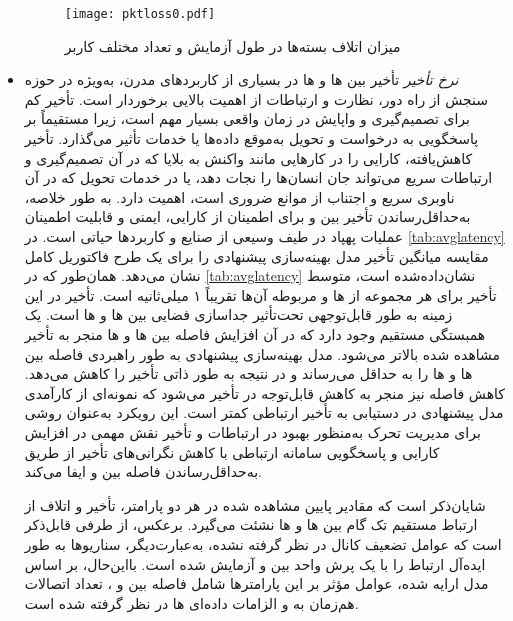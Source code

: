 \begin{itemize}
\begin{figure}
\texttt{[image: pktloss0.pdf]}
\caption[%
میزان اتلاف بسته‌ها در طول آزمایش و تعداد مختلف کاربر]{میزان اتلاف بسته‌ها در طول آزمایش و تعداد مختلف کاربر}
	\label{fig:PacketLossPlot}
\end{figure}		
	\item  \textit{نرخ تأخیر}
	تأخیر بین ها و ها در بسیاری از کاربردهای مدرن، به‌ویژه در حوزه سنجش از راه دور، نظارت و ارتباطات از اهمیت بالایی برخوردار است. تأخیر کم برای تصمیم‌گیری و واپایش در زمان واقعی بسیار مهم است، زیرا مستقیماً بر پاسخگویی  به درخواست  و تحویل به‌موقع داده‌ها یا خدمات تأثیر می‌گذارد. تأخیر کاهش‌یافته، کارایی  را در کارهایی مانند واکنش به بلایا که در آن تصمیم‌گیری و ارتباطات سریع می‌تواند جان انسان‌ها را نجات دهد، یا در خدمات تحویل که در آن ناوبری سریع و اجتناب از موانع ضروری است، اهمیت دارد. به طور خلاصه، به‌حداقل‌رساندن تأخیر بین  و  برای اطمینان از کارایی، ایمنی و قابلیت اطمینان عملیات پهپاد در طیف وسیعی از صنایع و کاربردها حیاتی است. 
	در \autoref{tab:avglatency} مقایسه میانگین تأخیر مدل بهینه‌سازی پیشنهادی را برای یک طرح فاکتوریل کامل نشان می‌دهد. همان‌طور که در \autoref{tab:avglatency} نشان‌داده‌شده است، متوسط تأخیر برای هر مجموعه از ها و  مربوطه آن‌ها تقریباً ۱ میلی‌ثانیه است.
	تأخیر در این زمینه به طور قابل‌توجهی تحت‌تأثیر جداسازی فضایی بین ها و ها است. یک همبستگی مستقیم وجود دارد که در آن افزایش فاصله بین ها و ها منجر به تأخیر مشاهده شده بالاتر می‌شود. مدل بهینه‌سازی پیشنهادی به طور راهبردی فاصله بین ها و ها را به حداقل می‌رساند و در نتیجه به طور ذاتی تأخیر را کاهش می‌دهد. کاهش فاصله نیز منجر به کاهش قابل‌توجه در تأخیر می‌شود که نمونه‌ای از کارآمدی مدل پیشنهادی در دستیابی به تأخیر ارتباطی کمتر است. این رویکرد به‌عنوان روشی برای مدیریت تحرک به‌منظور بهبود در ارتباطات و تأخیر نقش مهمی در افزایش کارایی و پاسخگویی سامانه ارتباطی با کاهش نگرانی‌های تأخیر از طریق به‌حداقل‌رساندن فاصله بین  و  ایفا می‌کند.
	
	شایان‌ذکر است که مقادیر پایین مشاهده شده در هر دو پارامتر، تأخیر و اتلاف از ارتباط مستقیم تک گام بین ها و ها نشئت می‌گیرد. برعکس، از طرفی قابل‌ذکر است که عوامل تضعیف کانال در نظر گرفته نشده، به‌عبارت‌دیگر، سناریوها به طور ایده‌آل ارتباط را با یک پرش واحد بین  و  آزمایش شده است. بااین‌حال، بر اساس مدل ارایه شده، عوامل مؤثر بر این پارامترها شامل فاصله بین  و ، تعداد اتصالات هم‌زمان به  و الزامات داده‌ای ها در نظر گرفته شده است.

\end{itemize}
